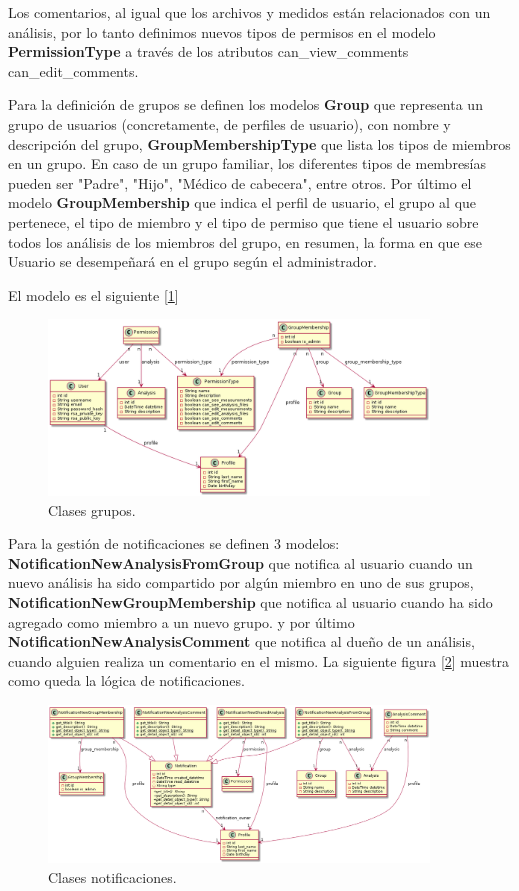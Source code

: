 Los comentarios, al igual que los archivos y medidos están relacionados con un análisis, por lo tanto definimos nuevos tipos de permisos en el modelo \textbf{PermissionType} a través de los atributos can\_view\_comments can\_edit\_comments.

Para la definición de grupos se definen los modelos \textbf{Group} que representa un grupo de usuarios (concretamente, de perfiles de usuario), con nombre y descripción del grupo, \textbf{GroupMembershipType} que lista los tipos de miembros en un grupo. En caso de un grupo familiar, los diferentes tipos de membresías pueden ser "Padre", "Hijo", "Médico de cabecera", entre otros. Por último el modelo \textbf{GroupMembership} que indica el perfil de usuario, el grupo al que pertenece, el tipo de miembro y el tipo de permiso que tiene el usuario sobre todos los análisis de los miembros del grupo, en resumen, la forma en que ese Usuario se desempeñará en el grupo según el administrador. 

El modelo es el siguiente [\ref{9-grupo}]
\newpage
	\begin{figure}[h]
        \centering
        \includegraphics[width=0.9\textwidth]{img/dc_grupos}
        \caption{Clases grupos.}
		\label{9-grupo}
    \end{figure}

Para la gestión de notificaciones se definen 3 modelos: \textbf{NotificationNewAnalysisFromGroup} que notifica al usuario cuando un nuevo análisis ha sido compartido por algún miembro en uno de sus grupos, \textbf{NotificationNewGroupMembership} que notifica al usuario cuando ha sido agregado como miembro a un nuevo grupo. y por último \textbf{NotificationNewAnalysisComment}  que notifica al dueño de un análisis, cuando alguien realiza un comentario en el mismo. La siguiente figura [\ref{9-notificaciones}] muestra como queda la lógica de notificaciones. 

	\begin{figure}[h]
        \centering
        \includegraphics[width=0.9\textwidth]{img/dc_notification}
        \caption{Clases notificaciones.}
		\label{9-notificaciones}
    \end{figure}

